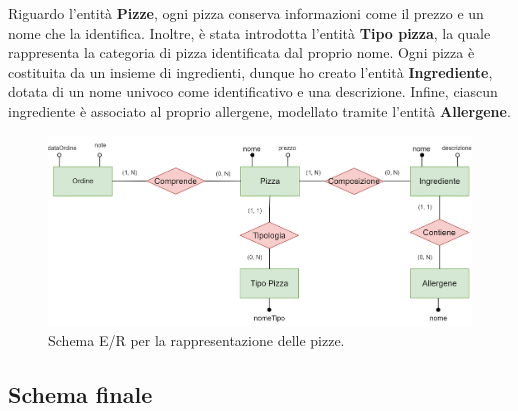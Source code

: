 \documentclass[a4paper,12pt, oneside]{article}
\begin{document}
\newpage
Riguardo l'entità \textbf{Pizze}, ogni pizza conserva informazioni
come il prezzo e un nome che la identifica. Inoltre, è stata
introdotta l'entità \textbf{Tipo pizza}, la quale rappresenta la
categoria di pizza identificata dal proprio nome. Ogni pizza è
costituita da un insieme di ingredienti, dunque ho creato l'entità
\textbf{Ingrediente}, dotata di un nome univoco come identificativo e
una descrizione. Infine, ciascun ingrediente è associato al proprio
allergene, modellato tramite l'entità \textbf{Allergene}.

\begin{figure}[ht]
    \centering
    \includegraphics[width=1\textwidth]{images/diagramma_pizza.png}
    \caption{Schema E/R per la rappresentazione delle pizze.}
    \label{fig:diagramma_pizza}
\end{figure}

\subsection{Schema finale}
\end{document}
